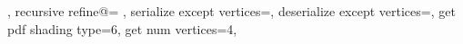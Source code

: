 {{		\expandafter\pgfplotsplothandlermesh@setnextvertex\expandafter{\pgfplotspatchclass@rect@M}%
		\expandafter\pgfplotsplothandlermesh@setnextvertex\expandafter{\pgfplotspatchclass@rect@B}%
		\expandafter\pgfplotsplothandlermesh@setnextvertex\expandafter{\pgfplotspatchclass@rect@C}%
		\expandafter\pgfplotsplothandlermesh@setnextvertex\expandafter{\pgfplotspatchclass@rect@M}%
		\expandafter\pgfplotsplothandlermesh@setnextvertex\expandafter{\pgfplotspatchclass@rect@D}%
		\expandafter\pgfplotsplothandlermesh@setnextvertex\expandafter{\pgfplotspatchclass@rect@A}%
		\expandafter\pgfplotsplothandlermesh@setnextvertex\expandafter{\pgfplotspatchclass@rect@M}%
		\expandafter\pgfplotsplothandlermesh@setnextvertex\expandafter{\pgfplotspatchclass@rect@C}%
		\expandafter\pgfplotsplothandlermesh@setnextvertex\expandafter{\pgfplotspatchclass@rect@D}%
		\expandafter\pgfplotsplothandlermesh@setnextvertex\expandafter{\pgfplotspatchclass@rect@M}%
		\let\pgfplotsplothandlermesh@patchclass=\pgfplotsplothandlermesh@patchclass@
	},%
	recursive refine@={%
	},%
	serialize except vertices=\let\pgfplotsretval\pgfutil@empty,%
	deserialize except vertices=,
	get pdf shading type=6,
	get num vertices=4,
}%

